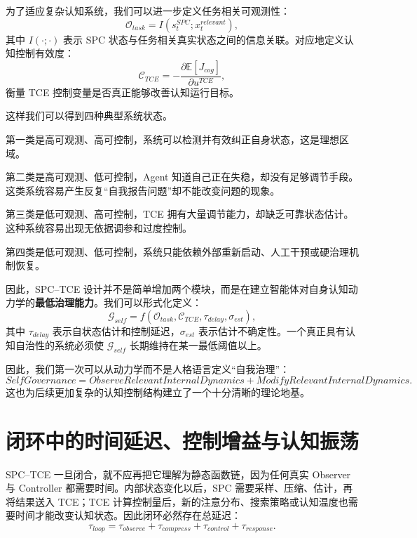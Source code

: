 为了适应复杂认知系统，我们可以进一步定义任务相关可观测性：
\begin{equation}
\mathcal O_{task}
=
I
\left(
s_t^{SPC};
x_t^{relevant}
\right),
\end{equation}
其中 $I(\cdot;\cdot)$ 表示 SPC 状态与任务相关真实状态之间的信息关联。对应地定义认知控制有效度：
\begin{equation}
\mathcal C_{TCE}
=
-
\frac{\partial
\mathbb E[J_{cog}]
}{
\partial u^{TCE}
},
\end{equation}
衡量 TCE 控制变量是否真正能够改善认知运行目标。

这样我们可以得到四种典型系统状态。

第一类是高可观测、高可控制，系统可以检测并有效纠正自身状态，这是理想区域。

第二类是高可观测、低可控制，Agent 知道自己正在失稳，却没有足够调节手段。这类系统容易产生反复``自我报告问题''却不能改变问题的现象。

第三类是低可观测、高可控制，TCE 拥有大量调节能力，却缺乏可靠状态估计。这种系统容易出现无依据调参和过度控制。

第四类是低可观测、低可控制，系统只能依赖外部重新启动、人工干预或硬治理机制恢复。

因此，SPC--TCE 设计并不是简单增加两个模块，而是在建立智能体对自身认知动力学的\textbf{最低治理能力}。我们可以形式化定义：
\begin{equation}
\mathcal G_{self}
=
f
\left(
\mathcal O_{task},
\mathcal C_{TCE},
\tau_{delay},
\sigma_{est}
\right),
\end{equation}
其中 $\tau_{delay}$ 表示自状态估计和控制延迟，$\sigma_{est}$ 表示估计不确定性。一个真正具有认知自治性的系统必须使 $\mathcal G_{self}$ 长期维持在某一最低阈值以上。

因此，我们第一次可以从动力学而不是人格语言定义``自我治理''：
\begin{equation}
\boxed{
SelfGovernance
=
ObserveRelevantInternalDynamics
+
ModifyRelevantInternalDynamics.
}
\end{equation}
这也为后续更加复杂的认知控制结构建立了一个十分清晰的理论地基。

\section{闭环中的时间延迟、控制增益与认知振荡}

SPC--TCE 一旦闭合，就不应再把它理解为静态函数链，因为任何真实 Observer 与 Controller 都需要时间。内部状态变化以后，SPC 需要采样、压缩、估计，再将结果送入 TCE；TCE 计算控制量后，新的注意分布、搜索策略或认知温度也需要时间才能改变认知状态。因此闭环必然存在总延迟：
\begin{equation}
\tau_{loop}
=
\tau_{observe}
+
\tau_{compress}
+
\tau_{control}
+
\tau_{response}.
\end{equation}

